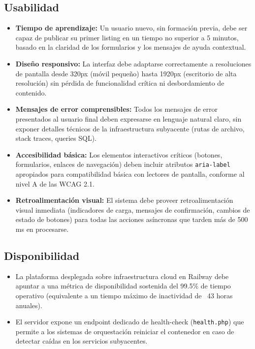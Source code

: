 \documentclass[11pt,a4paper]{report}
\begin{document}
\subsection{Usabilidad}
\begin{itemize}
    \item \textbf{Tiempo de aprendizaje:} Un usuario nuevo, sin formación previa, debe ser capaz de publicar su primer listing en un tiempo no superior a 5 minutos, basado en la claridad de los formularios y los mensajes de ayuda contextual.
    \item \textbf{Diseño responsivo:} La interfaz debe adaptarse correctamente a resoluciones de pantalla desde 320px (móvil pequeño) hasta 1920px (escritorio de alta resolución) sin pérdida de funcionalidad crítica ni desbordamiento de contenido.
    \item \textbf{Mensajes de error comprensibles:} Todos los mensajes de error presentados al usuario final deben expresarse en lenguaje natural claro, sin exponer detalles técnicos de la infraestructura subyacente (rutas de archivo, stack traces, queries SQL).
    \item \textbf{Accesibilidad básica:} Los elementos interactivos críticos (botones, formularios, enlaces de navegación) deben incluir atributos \texttt{aria-label} apropiados para compatibilidad básica con lectores de pantalla, conforme al nivel A de las WCAG 2.1.
    \item \textbf{Retroalimentación visual:} El sistema debe proveer retroalimentación visual inmediata (indicadores de carga, mensajes de confirmación, cambios de estado de botones) para todas las acciones asíncronas que tarden más de 500 ms en procesarse.
\end{itemize}

\subsection{Disponibilidad}
\begin{itemize}
    \item La plataforma desplegada sobre infraestructura cloud en Railway debe apuntar a una métrica de disponibilidad sostenida del 99.5\% de tiempo operativo (equivalente a un tiempo máximo de inactividad de ~43 horas anuales).
    \item El servidor expone un endpoint dedicado de health-check (\texttt{health.php}) que permite a los sistemas de orquestación reiniciar el contenedor en caso de detectar caídas en los servicios subyacentes.
\end{itemize}
\end{document}

